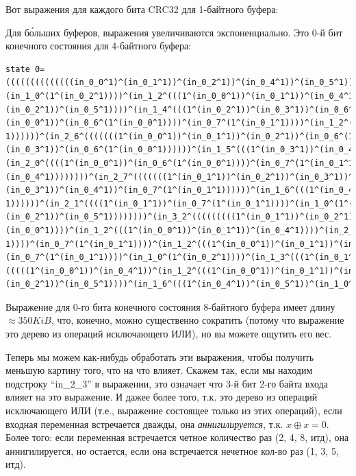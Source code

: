 

Вот выражения для каждого бита CRC32 для 1-байтного буфера:



Для б\'{о}льших буферов, выражения увеличиваются экспоненциально.
Это 0-й бит конечного состояния для 4-байтного буфера:

\begin{lstlisting}
state 0=((((((((((((((in_0_0^1)^(in_0_1^1))^(in_0_2^1))^(in_0_4^1))^(in_0_5^1))^(in_0_7^(1^(in_0_1^1))))^
(in_1_0^(1^(in_0_2^1))))^(in_1_2^(((1^(in_0_0^1))^(in_0_1^1))^(in_0_4^1))))^(in_1_3^(((1^(in_0_1^1))^
(in_0_2^1))^(in_0_5^1))))^(in_1_4^(((1^(in_0_2^1))^(in_0_3^1))^(in_0_6^(1^(in_0_0^1))))))^(in_2_0^((((1^
(in_0_0^1))^(in_0_6^(1^(in_0_0^1))))^(in_0_7^(1^(in_0_1^1))))^(in_1_2^(((1^(in_0_0^1))^(in_0_1^1))^(in_0_4^
1))))))^(in_2_6^(((((((1^(in_0_0^1))^(in_0_1^1))^(in_0_2^1))^(in_0_6^(1^(in_0_0^1))))^(in_1_4^(((1^(in_0_2^1))^
(in_0_3^1))^(in_0_6^(1^(in_0_0^1))))))^(in_1_5^(((1^(in_0_3^1))^(in_0_4^1))^(in_0_7^(1^(in_0_1^1))))))^
(in_2_0^((((1^(in_0_0^1))^(in_0_6^(1^(in_0_0^1))))^(in_0_7^(1^(in_0_1^1))))^(in_1_2^(((1^(in_0_0^1))^(in_0_1^1))^
(in_0_4^1))))))))^(in_2_7^(((((((1^(in_0_1^1))^(in_0_2^1))^(in_0_3^1))^(in_0_7^(1^(in_0_1^1))))^(in_1_5^(((1^
(in_0_3^1))^(in_0_4^1))^(in_0_7^(1^(in_0_1^1))))))^(in_1_6^(((1^(in_0_4^1))^(in_0_5^1))^(in_1_0^(1^(in_0_2^
1))))))^(in_2_1^((((1^(in_0_1^1))^(in_0_7^(1^(in_0_1^1))))^(in_1_0^(1^(in_0_2^1))))^(in_1_3^(((1^(in_0_1^1))^
(in_0_2^1))^(in_0_5^1))))))))^(in_3_2^(((((((((1^(in_0_1^1))^(in_0_2^1))^(in_0_4^1))^(in_0_5^1))^(in_0_6^(1^
(in_0_0^1))))^(in_1_2^(((1^(in_0_0^1))^(in_0_1^1))^(in_0_4^1))))^(in_2_0^((((1^(in_0_0^1))^(in_0_6^(1^(in_0_0^
1))))^(in_0_7^(1^(in_0_1^1))))^(in_1_2^(((1^(in_0_0^1))^(in_0_1^1))^(in_0_4^1))))))^(in_2_1^((((1^(in_0_1^1))^
(in_0_7^(1^(in_0_1^1))))^(in_1_0^(1^(in_0_2^1))))^(in_1_3^(((1^(in_0_1^1))^(in_0_2^1))^(in_0_5^1))))))^(in_2_4^
(((((1^(in_0_0^1))^(in_0_4^1))^(in_1_2^(((1^(in_0_0^1))^(in_0_1^1))^(in_0_4^1))))^(in_1_3^(((1^(in_0_1^1))^
(in_0_2^1))^(in_0_5^1))))^(in_1_6^(((1^(in_0_4^1))^(in_0_5^1))^(in_1_0^(1^(in_0_2^1))))))))))
\end{lstlisting}

Выражение для 0-го бита конечного состояния 8-байтного буфера имеет длину
$\approx 350KiB$, что, конечно, можно существенно сократить (потому что выражение это дерево из операций исключающего ИЛИ),
но вы можете ощутить его вес.

Теперь мы можем как-нибудь обработать эти выражения, чтобы получить меньшую картину того, что на что влияет.
Скажем так, если мы находим подстроку ``in\_2\_3'' в выражении, это означает что 3-й бит 2-го байта входа влияет на 
это выражение.
И дажее более того, т.к. это дерево из операций исключающего ИЛИ (т.е., выражение состоящее только из этих операций),
если входная переменная встречается дважды, она \textit{аннигилируется}, т.к. $x \oplus x=0$.
Более того: если переменная встречается четное количество раз (2, 4, 8, итд), она аннигилируется,
но остается, если она встречается нечетное кол-во раз (1, 3, 5, итд).

